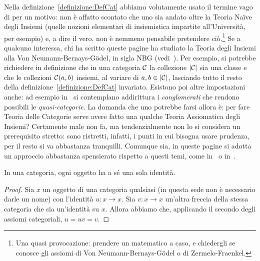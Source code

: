 \begin{nota}
Nella definizione~\ref{definizione:DefCat} abbiamo volutamente usato il termine vago di  per un motivo: non è affatto scontato che uno sia andato oltre la Teoria Na\"ive degli Insiemi (quelle nozioni elementari di insiemistica impartite all'Università, per esempio) e, a dire il vero, non è nemmeno pensabile pretendere ciò.\footnote{Una quasi provocazione: prendere un matematico a caso, e chiedergli se conosce gli assiomi di Von Neumann-Bernays-G\"odel o di Zermelo-Fraenkel.}\newline
Se a qualcuno interessa, chi ha scritto queste pagine ha studiato la Teoria degli Insiemi alla Von Neumann-Bernays-G\"odel, in sigla NBG (vedi~\cite{berarducci:insiemi}). Per esempio, si potrebbe richiedere in definizione che in una categoria \(\mathcal C\) la collezione \(\lvert\mathcal C\rvert\) sia una classe e che le collezioni \(\mathcal C(a, b)\) insiemi, al variare di \(a, b \in \lvert\mathcal C\rvert\), lasciando tutto il resto della definizione~\ref{definizione:DefCat} invariato. Esistono poi altre impostazioni anche: ad esempio in~\cite{adamek-herrlich-strecker:cats} si contemplano addirittura i {\em conglomerati} che rendono possibili le {\em quasi-categorie}.\newline
La domanda che uno potrebbe farsi allora è: per fare Teoria delle Categorie serve avere fatto una qualche Teoria Assiomatica degli Insiemi? Certamente male non fa, ma tendenzialmente non lo si considera un prerequisito stretto: sono ristretti, infatti, i punti in cui bisogna usare prudenza, per il resto si va abbastanza tranquilli.\newline
Comunque sia, in queste pagine si adotta un approccio abbastanza spensierato rispetto a questi temi, come in~\cite{goldblatt:topoi} o in~\cite{leinster:category}.
\end{nota}

\begin{teorema}
In una categoria, ogni oggetto ha a sé una sola identità. 
\end{teorema}

\begin{proof}
Sia \(x\) un oggetto di una categoria qualsiasi (in questa sede non è necessario darle un nome) con l'identità \(u : x \to x\). Sia \(v : x \to x\) un'altra freccia della stessa categoria che sia un'identità su \(x\). Allora abbiamo che, applicando il secondo degli assiomi categoriali, \(u = u v = v\).
\end{proof}

